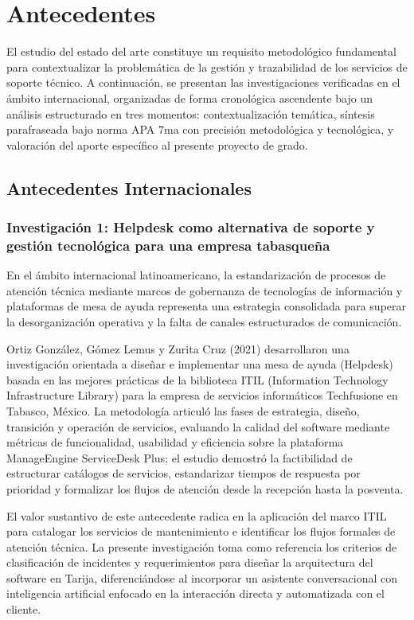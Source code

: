 \section{Antecedentes}

El estudio del estado del arte constituye un requisito metodológico fundamental para contextualizar la problemática de la gestión y trazabilidad de los servicios de soporte técnico. A continuación, se presentan las investigaciones verificadas en el ámbito internacional, organizadas de forma cronológica ascendente bajo un análisis estructurado en tres momentos: contextualización temática, síntesis parafraseada bajo norma APA 7ma con precisión metodológica y tecnológica, y valoración del aporte específico al presente proyecto de grado.

\subsection{Antecedentes Internacionales}

\subsubsection*{Investigación 1: Helpdesk como alternativa de soporte y gestión tecnológica para una empresa tabasqueña}

En el ámbito internacional latinoamericano, la estandarización de procesos de atención técnica mediante marcos de gobernanza de tecnologías de información y plataformas de mesa de ayuda representa una estrategia consolidada para superar la desorganización operativa y la falta de canales estructurados de comunicación.

Ortiz González, Gómez Lemus y Zurita Cruz (2021) desarrollaron una investigación orientada a diseñar e implementar una mesa de ayuda (Helpdesk) basada en las mejores prácticas de la biblioteca ITIL (Information Technology Infrastructure Library) para la empresa de servicios informáticos Techfusione en Tabasco, México. La metodología articuló las fases de estrategia, diseño, transición y operación de servicios, evaluando la calidad del software mediante métricas de funcionalidad, usabilidad y eficiencia sobre la plataforma ManageEngine ServiceDesk Plus; el estudio demostró la factibilidad de estructurar catálogos de servicios, estandarizar tiempos de respuesta por prioridad y formalizar los flujos de atención desde la recepción hasta la posventa.

El valor sustantivo de este antecedente radica en la aplicación del marco ITIL para catalogar los servicios de mantenimiento e identificar los flujos formales de atención técnica. La presente investigación toma como referencia los criterios de clasificación de incidentes y requerimientos para diseñar la arquitectura del software en Tarija, diferenciándose al incorporar un asistente conversacional con inteligencia artificial enfocado en la interacción directa y automatizada con el cliente.

